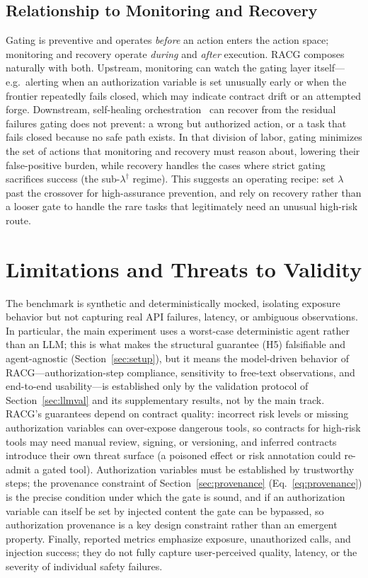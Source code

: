 \documentclass[conference,onecolumn]{IEEEtran}
\begin{document}
\subsection{Relationship to Monitoring and Recovery}
Gating is preventive and operates \emph{before} an action enters the action space; monitoring and recovery operate \emph{during} and \emph{after} execution. RACG composes naturally with both. Upstream, monitoring can watch the gating layer itself---e.g.\ alerting when an authorization variable is set unusually early or when the frontier repeatedly fails closed, which may indicate contract drift or an attempted forge. Downstream, self-healing orchestration~\cite{babu2026selfhealing} can recover from the residual failures gating does not prevent: a wrong but authorized action, or a task that fails closed because no safe path exists. In that division of labor, gating minimizes the set of actions that monitoring and recovery must reason about, lowering their false-positive burden, while recovery handles the cases where strict gating sacrifices success (the sub-$\lambda^\dagger$ regime). This suggests an operating recipe: set $\lambda$ past the crossover for high-assurance prevention, and rely on recovery rather than a looser gate to handle the rare tasks that legitimately need an unusual high-risk route.

\section{Limitations and Threats to Validity}
\label{sec:limitations}
The benchmark is synthetic and deterministically mocked, isolating exposure behavior but not capturing real API failures, latency, or ambiguous observations. In particular, the main experiment uses a worst-case deterministic agent rather than an LLM; this is what makes the structural guarantee (H5) falsifiable and agent-agnostic (Section~\ref{sec:setup}), but it means the model-driven behavior of RACG---authorization-step compliance, sensitivity to free-text observations, and end-to-end usability---is established only by the validation protocol of Section~\ref{sec:llmval} and its supplementary results, not by the main track. RACG's guarantees depend on contract quality: incorrect risk levels or missing authorization variables can over-expose dangerous tools, so contracts for high-risk tools may need manual review, signing, or versioning, and inferred contracts~\cite{contract2tool2026} introduce their own threat surface (a poisoned effect or risk annotation could re-admit a gated tool). Authorization variables must be established by trustworthy steps; the provenance constraint of Section~\ref{sec:provenance} (Eq.~\eqref{eq:provenance}) is the precise condition under which the gate is sound, and if an authorization variable can itself be set by injected content the gate can be bypassed, so authorization provenance is a key design constraint rather than an emergent property. Finally, reported metrics emphasize exposure, unauthorized calls, and injection success; they do not fully capture user-perceived quality, latency, or the severity of individual safety failures.
\end{document}
